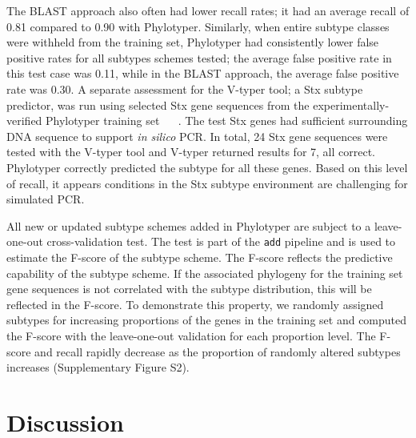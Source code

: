 \documentclass{bioinfo}
\providecommand{\DIFadd}[1]{{\protect\color{red}#1}} %
\providecommand{\DIFaddbegin}{} %
\providecommand{\DIFaddend}{} %
\begin{document}
\DIFaddbegin \DIFadd{The BLAST approach also often had lower recall rates; it had an average recall of 0.81 compared to 0.90 with Phylotyper.
Similarly, when entire subtype classes were withheld from the training set, Phylotyper had consistently lower false positive rates for all subtypes schemes tested; the average false positive rate in this test case was 0.11, while in the BLAST approach, the average false positive rate was 0.30.
A separate assessment for the V-typer tool; a Stx subtype predictor, was run using selected Stx gene sequences from the experimentally-verified Phylotyper training set \mbox{%
\citep{CARRILLO2016}
}%
.
The test Stx genes had sufficient surrounding DNA sequence to support }\textit{\DIFadd{in silico}} \DIFadd{PCR.
In total, 24 Stx gene sequences were tested with the V-typer tool and V-typer returned results for 7, all correct.
Phylotyper correctly predicted the subtype for all these genes.
Based on this level of recall, it appears conditions in the Stx subtype environment are challenging for simulated PCR.
}

\DIFadd{All new or updated subtype schemes added in Phylotyper are subject to a leave-one-out cross-validation test.
The test is part of the }\texttt{\DIFadd{add}} \DIFadd{pipeline and is used to estimate the F-score of the subtype scheme. 
The F-score reflects the predictive capability of the subtype scheme. 
If the associated phylogeny for the training set gene sequences is not correlated with the subtype distribution, this will be reflected in the F-score. 
To demonstrate this property, we randomly assigned subtypes for increasing proportions of the genes in the training set and computed the F-score with the leave-one-out validation for each proportion level.
The F-score and recall rapidly decrease as the proportion of randomly altered subtypes increases (Supplementary Figure S2).
}\DIFaddend 

\section{Discussion}
\end{document}
